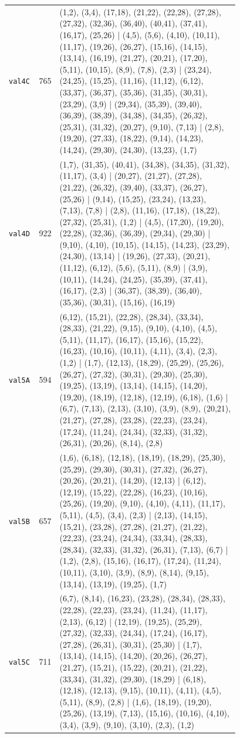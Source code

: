\begin{landscape}
\begin{longtable}{lr>{\tiny\raggedright\arraybackslash}p{0.78\linewidth}}
\texttt{val4C} & 765 & (1,2), (3,4), (17,18), (21,22), (22,28), (27,28), (27,32), (32,36), (36,40), (40,41), (37,41), (16,17), (25,26) | (4,5), (5,6), (4,10), (10,11), (11,17), (19,26), (26,27), (15,16), (14,15), (13,14), (16,19), (21,27), (20,21), (17,20), (5,11), (10,15), (8,9), (7,8), (2,3) | (23,24), (24,25), (15,25), (11,16), (11,12), (6,12), (33,37), (36,37), (35,36), (31,35), (30,31), (23,29), (3,9) | (29,34), (35,39), (39,40), (36,39), (38,39), (34,38), (34,35), (26,32), (25,31), (31,32), (20,27), (9,10), (7,13) | (2,8), (19,20), (27,33), (18,22), (9,14), (14,23), (14,24), (29,30), (24,30), (13,23), (1,7) \\[2pt]
\texttt{val4D} & 922 & (1,7), (31,35), (40,41), (34,38), (34,35), (31,32), (11,17), (3,4) | (20,27), (21,27), (27,28), (21,22), (26,32), (39,40), (33,37), (26,27), (25,26) | (9,14), (15,25), (23,24), (13,23), (7,13), (7,8) | (2,8), (11,16), (17,18), (18,22), (27,32), (25,31), (1,2) | (4,5), (17,20), (19,20), (22,28), (32,36), (36,39), (29,34), (29,30) | (9,10), (4,10), (10,15), (14,15), (14,23), (23,29), (24,30), (13,14) | (19,26), (27,33), (20,21), (11,12), (6,12), (5,6), (5,11), (8,9) | (3,9), (10,11), (14,24), (24,25), (35,39), (37,41), (16,17), (2,3) | (36,37), (38,39), (36,40), (35,36), (30,31), (15,16), (16,19) \\[2pt]
\texttt{val5A} & 594 & (6,12), (15,21), (22,28), (28,34), (33,34), (28,33), (21,22), (9,15), (9,10), (4,10), (4,5), (5,11), (11,17), (16,17), (15,16), (15,22), (16,23), (10,16), (10,11), (4,11), (3,4), (2,3), (1,2) | (1,7), (12,13), (18,29), (25,29), (25,26), (26,27), (27,32), (30,31), (29,30), (25,30), (19,25), (13,19), (13,14), (14,15), (14,20), (19,20), (18,19), (12,18), (12,19), (6,18), (1,6) | (6,7), (7,13), (2,13), (3,10), (3,9), (8,9), (20,21), (21,27), (27,28), (23,28), (22,23), (23,24), (17,24), (11,24), (24,34), (32,33), (31,32), (26,31), (20,26), (8,14), (2,8) \\[2pt]
\texttt{val5B} & 657 & (1,6), (6,18), (12,18), (18,19), (18,29), (25,30), (25,29), (29,30), (30,31), (27,32), (26,27), (20,26), (20,21), (14,20), (12,13) | (6,12), (12,19), (15,22), (22,28), (16,23), (10,16), (25,26), (19,20), (9,10), (4,10), (4,11), (11,17), (5,11), (4,5), (3,4), (2,3) | (2,13), (14,15), (15,21), (23,28), (27,28), (21,27), (21,22), (22,23), (23,24), (24,34), (33,34), (28,33), (28,34), (32,33), (31,32), (26,31), (7,13), (6,7) | (1,2), (2,8), (15,16), (16,17), (17,24), (11,24), (10,11), (3,10), (3,9), (8,9), (8,14), (9,15), (13,14), (13,19), (19,25), (1,7) \\[2pt]
\texttt{val5C} & 711 & (6,7), (8,14), (16,23), (23,28), (28,34), (28,33), (22,28), (22,23), (23,24), (11,24), (11,17), (2,13), (6,12) | (12,19), (19,25), (25,29), (27,32), (32,33), (24,34), (17,24), (16,17), (27,28), (26,31), (30,31), (25,30) | (1,7), (13,14), (14,15), (14,20), (20,26), (26,27), (21,27), (15,21), (15,22), (20,21), (21,22), (33,34), (31,32), (29,30), (18,29) | (6,18), (12,18), (12,13), (9,15), (10,11), (4,11), (4,5), (5,11), (8,9), (2,8) | (1,6), (18,19), (19,20), (25,26), (13,19), (7,13), (15,16), (10,16), (4,10), (3,4), (3,9), (9,10), (3,10), (2,3), (1,2) \\[2pt]

\end{longtable}
\end{landscape}
